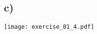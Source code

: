 \documentclass[10pt,oneside,a4paper]{scrartcl}
\begin{document}
    \subsection*{c)}
    
    \begin{center}
        \texttt{[image: exercise\_01\_4.pdf]}
    \end{center}
\end{document}
